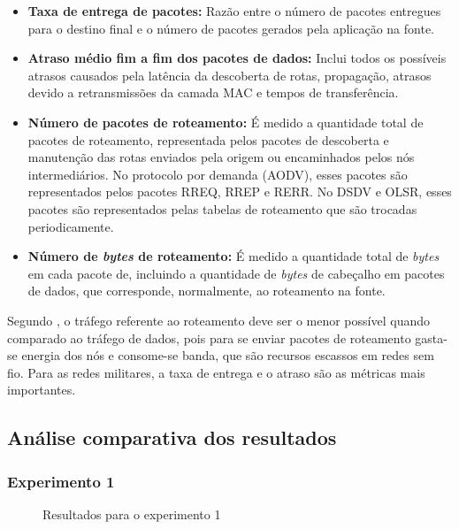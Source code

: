 \begin{itemize}
	\item \textbf{Taxa de entrega de pacotes:} Raz\~ao entre o n\'umero de pacotes entregues para o destino final e o n\'umero de pacotes gerados pela aplica\c{c}\~ao na fonte.
	\item \textbf{Atraso m\'edio fim a fim dos pacotes de dados:} Inclui todos os poss\'iveis atrasos causados pela lat\^encia da descoberta de rotas, propaga\c{c}\~ao, atrasos devido a retransmiss\~oes da camada MAC e tempos de transfer\^encia.
	\item \textbf{N\'umero de pacotes de roteamento:} \'E medido a quantidade total de pacotes de roteamento, representada pelos pacotes de descoberta e manuten\c{c}\~ao das rotas enviados pela origem ou encaminhados pelos n\'os intermedi\'arios. No protocolo por demanda (AODV), esses pacotes s\~ao representados pelos pacotes RREQ, RREP e RERR. No DSDV e OLSR, esses pacotes s\~ao representados pelas tabelas de roteamento que s\~ao trocadas periodicamente.
	\item \textbf{N\'umero de \textit{bytes} de roteamento:} \'E medido a quantidade total de \textit{bytes} em cada pacote de, incluindo a quantidade de \textit{bytes} de cabe\c{c}alho em pacotes de dados, que corresponde, normalmente, ao roteamento na fonte.
\end{itemize}
Segundo \cite{pereira}, o tr\'afego referente ao roteamento deve ser o menor poss\'ivel quando comparado ao tr\'afego de dados, pois para se enviar pacotes de roteamento gasta-se energia dos n\'os e consome-se banda, que s\~ao recursos escassos em redes sem fio. 
Para as redes militares, a taxa de entrega e o atraso s\~ao as m\'etricas mais importantes.

\subsection{An\'alise comparativa dos resultados}

\subsubsection{Experimento 1}

\begin{figure}[H]
	\centering
	\label{subfig:exp1Lost}
	\label{subfig:exp1Late}
	\label{subfig:exp1Byte}
	\label{subfig:exp1Pkts}
	
	\caption{Resultados para o experimento 1}
	\label{fig:resulExp1}
\end{figure}

